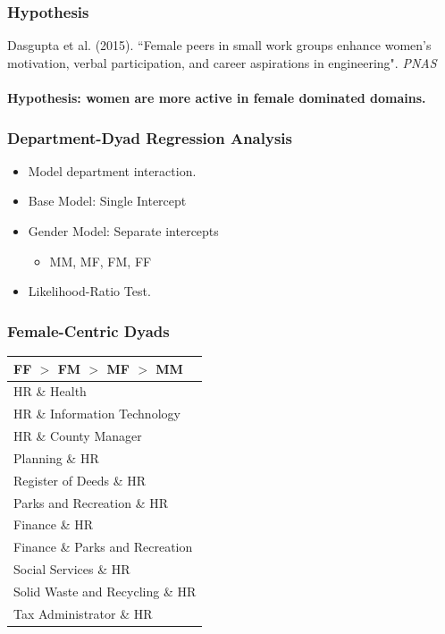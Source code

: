 \documentclass[xcolor={table}, fleqn]{beamer}
\newcommand{\male}[1]{\colorbox{male}{#1}}
\newcommand{\female}[1]{\colorbox{female}{#1}}
\begin{document}
\begin{frame}\frametitle{Hypothesis}
	\LARGE
Dasgupta et al. (2015). ``Female peers in small work groups enhance women’s motivation, verbal participation, and career aspirations in engineering". \emph{PNAS} \\~\\
\textbf{Hypothesis: women are more active in female dominated  domains.}
\end{frame}

\begin{frame}\frametitle{Department-Dyad Regression Analysis}
	\LARGE
	\begin{itemize}
		\item Model department interaction.
		\vspace*{.3in}
		\item Base Model: Single Intercept
		\vspace*{.3in}
		\item Gender Model: Separate intercepts
		\vspace*{.15in}
		\begin{itemize}
			\LARGE
			\item MM, MF, FM, FF
		\end{itemize}
		\vspace*{.15in}
		\item Likelihood-Ratio Test.
	\end{itemize}
\end{frame}


\begin{frame}\frametitle{Female-Centric Dyads}
	\centering
	\Large
	\begin{tabular}{l}
	  \toprule
	FF $>$ FM $>$ MF $>$ MM  \\
	\hline
	  \female{HR} \& Health  \\ 
	  \female{HR} \& \male{Information Technology}  \\ 
	  \female{HR} \& \male{County Manager}  \\ 
	  \male{Planning} \& \female{HR} \\ 
	  Register of Deeds \& \female{HR}  \\ 
	  Parks and Recreation \& \female{HR}  \\ 
	  \female{Finance} \& \female{HR}  \\ 
	  \female{Finance} \& Parks and Recreation  \\ 
	  Social Services \& \female{HR}  \\ 
	  \male{Solid Waste and Recycling} \& \female{HR}  \\ 
	  Tax Administrator \& \female{HR}  \\ 
	   \bottomrule
	\end{tabular}
	
	
	
	
\end{frame}
\end{document}
